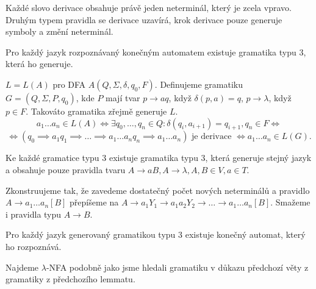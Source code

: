 \documentclass[12pt]{article}                   %
\begin{document}
    \begin{pozorovani}
        Každé slovo derivace obsahuje právě jeden neterminál, který je zcela vpravo. Druhým typem pravidla se derivace uzavírá, krok derivace pouze generuje symboly a změní neterminál.
    \end{pozorovani}

    \begin{veta}
        Pro každý jazyk rozpoznávaný konečným automatem existuje gramatika typu 3, která ho generuje.

        \begin{dukazin}
            $L = L(A)$ pro DFA $A(Q, \Sigma, \delta, q_0, F)$. Definujeme gramatiku $G = (Q, \Sigma, P, q_0)$, kde $P$ mají tvar $p \rightarrow aq$, když $\delta(p, a) = q$, $p \rightarrow \lambda$, když $p \in F$. Takováto gramatika zřejmě generuje $L$.
            $$ a_1…a_n \in L(A) \Leftrightarrow \exists q_0, …, q_n \in Q: \delta(q_i, a_{i+1}) = q_{i+1}, q_n \in F \Leftrightarrow $$ 
            $$ \Leftrightarrow (q_0 \implies a_1q_1 \implies … \implies a_1…a_nq_n \implies a_1…a_n) \text{ je derivace } \Leftrightarrow a_1…a_n \in L(G). $$ 
        \end{dukazin}
    \end{veta}

    \begin{lemma}
        Ke každé gramatice typu 3 existuje gramatika typu 3, která generuje stejný jazyk a obsahuje pouze pravidla tvaru $A \rightarrow aB, A \rightarrow \lambda, A, B \in V, a \in T$.

        \begin{dukazin}
            Zkonstruujeme tak, že zavedeme dostatečný počet nových neterminálů a pravidlo $A \rightarrow a_1…a_n[B]$ přepíšeme na $A \rightarrow a_1Y_1 \rightarrow a_1a_2Y_2 \rightarrow … \rightarrow a_1…a_n[B]$. Smažeme i pravidla typu $A \rightarrow B$.
        \end{dukazin}
    \end{lemma}

    \begin{veta}
        Pro každý jazyk generovaný gramatikou typu 3 existuje konečný automat, který ho rozpoznává.

        \begin{dukazin}
            Najdeme $\lambda$-NFA podobně jako jsme hledali gramatiku v důkazu předchozí věty z gramatiky z předchozího lemmatu.
        \end{dukazin}
    \end{veta}
\end{document}
